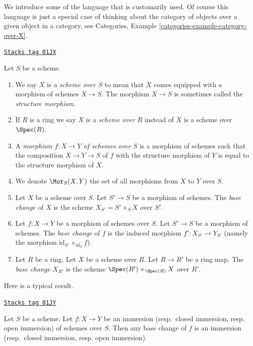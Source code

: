 \medskip\noindent
We introduce some of the language that is customarily used.
Of course this language is just a special case of thinking
about the category of objects over a given object in a category,
see Categories, Example \ref{categories-example-category-over-X}.

\begin{definition}
\label{schemes-definition-base-change}
\href{https://stacks.math.columbia.edu/tag/01JX}{\texttt{Stacks tag 01JX}}

Let $S$ be a scheme.
\begin{enumerate}
\item We say $X$ is a {\it scheme over $S$} to mean that $X$
comes equipped with a morphism of schemes $X \to S$.
The morphism $X \to S$ is sometimes called the
{\it structure morphism}.
\item If $R$ is a ring we say
$X$ is a {\it scheme over $R$} instead of
$X$ is a scheme over $\Spec(R)$.
\item A {\it morphism $f : X \to Y$ of schemes over $S$}
is a morphism of schemes such that the composition
$X \to Y \to S$ of $f$ with the structure morphism of $Y$ is
equal to the structure morphism of $X$.
\item We denote $\Mor_S(X, Y)$ the set of all morphisms
from $X$ to $Y$ over $S$.
\item Let $X$ be a scheme over $S$. Let $S' \to S$ be a
morphism of schemes. The {\it base change} of $X$
is the scheme $X_{S'} = S' \times_S X$ over $S'$.
\item Let $f : X \to Y$ be a morphism of schemes over $S$. Let $S' \to S$
be a morphism of schemes. The {\it base change} of $f$ is
the induced morphism $f' : X_{S'} \to Y_{S'}$ (namely the
morphism $\text{id}_{S'} \times_{\text{id}_S} f$).
\item Let $R$ be a ring. Let $X$ be a scheme over $R$.
Let $R \to R'$ be a ring map. The {\it base change} $X_{R'}$
is the scheme $\Spec(R') \times_{\Spec(R)} X$
over $R'$.
\end{enumerate}
\end{definition}

Here is a typical result.

\begin{lemma}
\label{schemes-lemma-base-change-immersion}
\href{https://stacks.math.columbia.edu/tag/01JY}{\texttt{Stacks tag 01JY}}

Let $S$ be a scheme. Let $f : X \to Y$ be an
immersion (resp.\ closed immersion, resp. open immersion)
of schemes over $S$. Then any base change of $f$ is an
immersion (resp.\ closed immersion, resp. open immersion).
\end{lemma}

